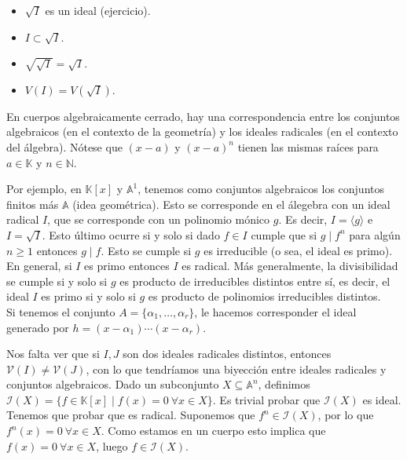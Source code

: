 \documentclass[ACGA.tex]{subfiles}
\begin{document}
\begin{propi}\mbox{}
\begin{itemize}
	\item $\sqrt{I}$ es un ideal (ejercicio).
	\item $I \subset \sqrt{I}$.
	\item $\sqrt{\sqrt{I}} = \sqrt{I}$.
	\item $V(I) = V(\sqrt{I})$.
\end{itemize}
\end{propi}

\begin{nota}
En cuerpos algebraicamente cerrado, hay una correspondencia entre los conjuntos algebraicos (en el contexto de la geometría) y los ideales radicales (en el contexto del álgebra). Nótese que $(x-a)$ y $(x-a)^n$ tienen las mismas raíces para $a\in\mathbb{K}$ y $n\in\mathbb{N}$. 
\end{nota}

\begin{ej}
Por ejemplo, en $\mathbb{K}[x]$ y $\mathbb{A}^1$, tenemos como conjuntos algebraicos los conjuntos finitos más $\mathbb{A}$ (idea geométrica). Esto se corresponde en el álegebra con un ideal radical $I$, que se corresponde con un polinomio mónico $g$. Es decir, $I=\langle g\rangle$ e $I=\sqrt{I}$. Esto último ocurre si y solo si dado $f\in I$ cumple que  si $g\mid f^n$ para algún $n\geq 1$ entonces $g\mid f$. Esto se cumple si $g$ es irreducible (o sea, el ideal es primo). En general, si $I$ es primo entonces $I$ es radical. Más generalmente, la divisibilidad se cumple si y solo si $g$ es producto de irreducibles distintos entre sí, es decir, el ideal $I$ es primo si y solo si $g$ es producto de polinomios irreducibles distintos.\\
Si tenemos el conjunto $A=\{\alpha_1,\dots, \alpha_r\}$, le hacemos corresponder el ideal generado por $h=(x-\alpha_1)\cdots(x-\alpha_r)$. 
\end{ej}

Nos falta ver que si $I,J$ son dos ideales radicales distintos, entonces $\mathcal{V}(I)\neq \mathcal{V}(J)$, con lo que tendríamos una biyección entre ideales radicales y conjuntos algebraicos. Dado un subconjunto $X\subseteq \mathbb{A}^n$,  definimos $\mathcal{I}(X)=\{f\in\mathbb{K}[x]\mid f(x)=0\ \forall x\in X\}$. Es trivial probar que $\mathcal{I}(X)$ es ideal. Tenemos que probar que es radical. Suponemos que $f^n\in\mathcal{I}(X)$, por lo que $f^n(x)=0\ \forall x\in X$. Como estamos en un cuerpo esto implica que $f(x)=0\ \forall x\in X$, luego $f\in\mathcal{I}(X)$. 
\end{document}
